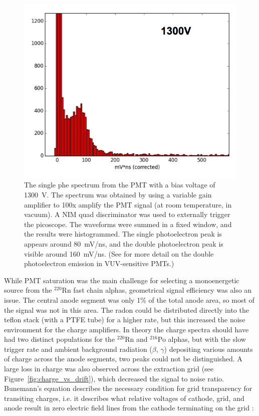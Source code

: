\begin{figure}[htbp]
\begin{center}
\includegraphics[width=\halffig]{figures/etrains/1300V_singlephe.png}
\caption{The single phe spectrum from the \acs{PMT} with a bias voltage of 1300~V. The spectrum was obtained by using a variable gain amplifier to 100x amplify the \acs{PMT} signal (at room temperature, in vacuum). A \acs{NIM} quad discriminator was used to externally trigger the picoscope. The waveforms were summed in a fixed window, and the results were histogrammed. The single photoelectron peak is appears around 80~mV/ns, and the double photoelectron peak is visible around 160~mV/ns. (See \cite{Faham2015} for more detail on the double photoelectron emission in \acs{VUV}-sensitive \acs{PMT}s.) }
\label{fig:single_phe}
\end{center}
\end{figure}

While \ac{PMT} saturation was the main challenge for selecting a monoenergetic source from the $^{220}$Rn fast chain alphas, geometrical signal efficiency was also an issue. The central anode segment was only 1\% of the total anode area, so most of the signal was not in this area. The radon could be distributed directly into the teflon stack (with a \ac{PTFE} tube) for a higher rate, but this increased the noise environment for the charge amplifiers. In theory the charge spectra should have had two distinct populations for the $^{220}$Rn and $^{216}$Po alphas, but with the slow trigger rate and ambient background radiation ($\beta$, $\gamma$) depositing various amounts of charge across the anode segments, two peaks could not be distinguished. A large loss in charge was also observed across the extraction grid (see Figure~\ref{fig:charge_vs_drift}), which decreased the signal to noise ratio. Bunemann's equation describes the necessary condition for grid transparency for transiting charges, i.e. it describes what relative voltages of cathode, grid, and anode result in zero electric field lines from the cathode terminating on the grid \cite{Bunemann1949} \cite{Bevilacqua2015}:

